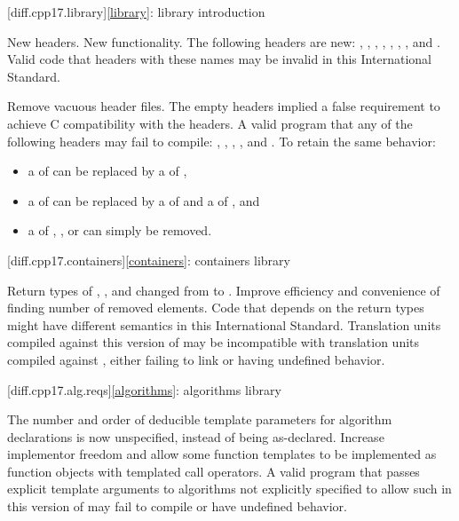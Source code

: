 [diff.cpp17.library]{\ref{library}: library introduction}

\change New headers.
\rationale New functionality.
\effect
The following \Cpp{} headers are new:
,
,
,
,
,
,
, and
.
Valid \CppXVII{} code that  headers with these names may be
invalid in this International Standard.

\change Remove vacuous \Cpp{} header files.
\rationale
The empty headers implied a false requirement to achieve C compatibility with the \Cpp{} headers.
\effect
A valid \CppXVII{} program that  any of the following headers may fail to compile:
,
,
,
, and
.
To retain the same behavior:
\begin{itemize}
\item
a  of  can be replaced by
a  of ,
\item
a  of  can be replaced by
a  of  and
a  of ,
and
\item
a  of
,
, or
can simply be removed.
\end{itemize}

[diff.cpp17.containers]{\ref{containers}: containers library}

\change
Return types of , , and 
changed from  to .
\rationale Improve efficiency and convenience of finding number of removed elements.
\effect
Code that depends on the return types might have different semantics in this International Standard.
Translation units compiled against this version of \Cpp{} may be incompatible with
translation units compiled against \CppXVII{}, either failing to link or having undefined behavior.

[diff.cpp17.alg.reqs]{\ref{algorithms}: algorithms library}

\change
The number and order of deducible template parameters for algorithm declarations
is now unspecified, instead of being as-declared.
\rationale Increase implementor freedom and allow some function templates
to be implemented as function objects with templated call operators.
\effect
A valid \CppXVII{} program that passes explicit template arguments to
algorithms not explicitly specified to allow such in this version of \Cpp{}
may fail to compile or have undefined behavior.

